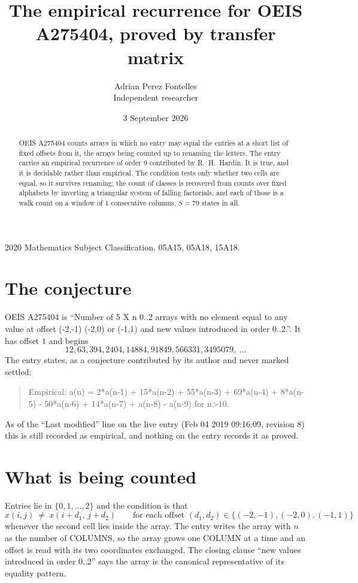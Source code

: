 \documentclass[11pt,a4paper]{article}
\title{The empirical recurrence for OEIS A275404, proved by transfer matrix}
\author{Adrian Perez Fontelles\\ \small Independent researcher}
\date{3 September 2026}
\theoremstyle{plain}
\theoremstyle{definition}
\begin{document}
\maketitle

\begin{abstract}
OEIS A275404 counts arrays in which no entry may equal the entries at a short list of fixed offsets
from it, the arrays being counted up to renaming the letters. The entry carries an empirical
recurrence of order $9$ contributed by R.~H.~Hardin. It is true, and it is decidable
rather than empirical. The condition tests only whether two cells are equal, so it survives
renaming; the count of classes is recovered from counts over fixed alphabets by inverting a
triangular system of falling factorials, and each of those is a walk count on a window of
$1$ consecutive columns, $S=79$ states in all.
\end{abstract}

\noindent\small 2020 Mathematics Subject Classification. 05A15, 05A18, 15A18.\normalsize

\section{The conjecture}

OEIS A275404 is ``Number of 5 X n 0..2 arrays with no element equal to any value at offset (-2,-1) (-2,0) or (-1,1) and new values introduced in order 0..2.''. It has offset $1$ and begins
\[
12, 63, 394, 2404, 14884, 91849, 566331, 3495079,\ \dots
\]
The entry states, as a conjecture contributed by its author and never marked settled:
\begin{quote}
Empirical: a(n) = 2*a(n-1) + 15*a(n-2) + 55*a(n-3) + 69*a(n-4) + 8*a(n-5) - 50*a(n-6) + 14*a(n-7) + a(n-8) - a(n-9) for n>10.
\end{quote}
As of the ``Last modified'' line on the live entry (Feb 04 2019 09:16:09, revision 8) this is still
recorded as empirical, and nothing on the entry records it as proved.

\section{What is being counted}

Entries lie in $\{0,1,\dots,2\}$ and the condition is that
\[
x(i,j)\ \ne\ x(i+d_1,\,j+d_2)\qquad\text{for each offset }(d_1,d_2)\in\{(-2,-1), (-2,0), (-1,1)\}
\]
whenever the second cell lies inside the array. The entry writes the array with $n$ as the number of COLUMNS, so the array grows one COLUMN at a time and an offset is read with its two coordinates exchanged. The closing clause ``new values
introduced in order $0..2$'' says the array is the canonical representative of its equality
pattern.
\end{document}
